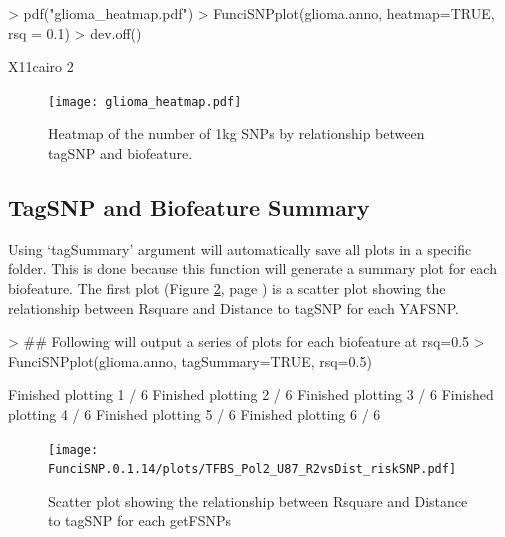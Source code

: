 \documentclass[12pt,fullpage]{article}
\begin{document}
\begin{Schunk}
\begin{Sinput}
> pdf("glioma_heatmap.pdf")
> FunciSNPplot(glioma.anno, heatmap=TRUE, rsq = 0.1)
> dev.off()
\end{Sinput}
\begin{Soutput}
X11cairo 
       2 
\end{Soutput}
\end{Schunk}

\begin{figure}[ht!]
\begin{center}
\texttt{[image: glioma\_heatmap.pdf]}
\caption{\label{fig:glioma_heatmap.pdf} Heatmap of the number of 1kg SNPs by
    relationship between tagSNP and biofeature.}
{\footnotesize{}}
\end{center}
\end{figure}

\subsection{TagSNP and Biofeature Summary}

Using `tagSummary' argument will automatically save all plots in a specific
folder. This is done because this function will generate a summary plot for each
biofeature. The first plot (Figure \ref{fig:TFBS_Pol2_U87_R2vsDist_riskSNP.pdf},
        page \pageref{fig:TFBS_Pol2_U87_R2vsDist_riskSNP.pdf}) is a scatter plot
showing the relationship between Rsquare and Distance to tagSNP for each
YAFSNP.

\begin{Schunk}
\begin{Sinput}
> ## Following will output a series of plots for each biofeature at rsq=0.5
> FunciSNPplot(glioma.anno, tagSummary=TRUE, rsq=0.5)
\end{Sinput}
\begin{Soutput}
Finished plotting  1 / 6 
Finished plotting  2 / 6 
Finished plotting  3 / 6 
Finished plotting  4 / 6 
Finished plotting  5 / 6 
Finished plotting  6 / 6 
\end{Soutput}
\end{Schunk}

\begin{figure}[ht!]
\begin{center}
\texttt{[image: FunciSNP.0.1.14/plots/TFBS\_Pol2\_U87\_R2vsDist\_riskSNP.pdf]}
\caption{\label{fig:TFBS_Pol2_U87_R2vsDist_riskSNP.pdf} Scatter plot 
showing the relationship between Rsquare and Distance to tagSNP for each 
getFSNPs}
{\footnotesize{}}
\end{center}
\end{figure}
\end{document}
